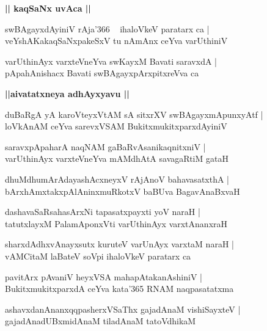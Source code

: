 \documentclass[twoside,12pt,openright]{book}
\newcounter{shloka}[chapter]
\def\uvaca#1{\centerline{{\large\textbf{#1}}}}
\begin{document}
\uvaca{|| kaqSaNx uvAca ||}

\begin{shloka}%
swBAgayxdAyiniV rAja\char'366 ~ ihaloVkeV paratarx ca |\\
veYshAKakaqSaNxpakeSxV tu nAmAnx ceYva varUthiniV
\end{shloka}

\begin{shloka}%
varUthinAyx varxteVneYva swKayxM Bavati saravxdA |\\
pApahAnishacx Bavati swBAgayxpArxpitxreVva ca
\end{shloka}

\uvaca{||aivatatxneya adhAyxyavu ||}

\begin{shloka}%
duBaRgA yA karoVteyxVtAM sA sitxrXV swBAgayxmApunxyAtf |\\
loVkAnAM ceYva sarevxVSAM BukitxmukitxparxdAyiniV 
\end{shloka}

\begin{shloka}%
saravxpApaharA naqNAM gaBaRvAsanikaqnitxniV |\\
varUthinAyx varxteVneYva mAMdhAtA savagaRtiM gataH 
\end{shloka}

\begin{shloka}%
dhuMdhumArAdayashAcxneyxV rAjAnoV bahavasatxthA |\\
bArxhAmxtakxpAlAninxmuRkotxV baBUva BagavAnaBxvaH  
\end{shloka}

\begin{shloka}%
dashavaSaRsahasArxNi tapasatxpayxti yoV naraH |\\
tatutxlayxM PalamAponxVti varUthinAyx varxtAnanxraH
\end{shloka}

\begin{shloka}%
sharxdAdhxvAnayxsutx kuruteV varUnAyx varxtaM naraH |\\
vAMCitaM laBateV soVpi ihaloVkeV paratarx ca 
\end{shloka}

\begin{shloka}%
pavitArx pAvaniV heyxVSA mahapAtakanAshiniV |\\
BukitxmukitxparxdA ceYva kata\char'365 RNAM naqpasatatxma 
\end{shloka}

\begin{shloka}%
ashavxdanAnanxqqpasherxVSaThx gajadAnaM vishiSayxteV |\\
gajadAnadUBxmidAnaM tiladAnaM tatoVdhikaM 
\end{shloka}
\end{document}

